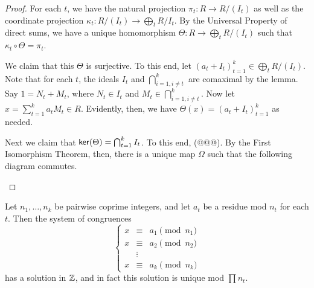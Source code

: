 \begin{proof}
For each \(t\), we have the natural projection \(\pi_t : R \rightarrow R/(I_t)\) as well as the coordinate projection \(\kappa_t : R/(I_t) \rightarrow \bigoplus_t R/I_t\).
By the Universal Property of direct sums, we have a unique homomorphism \(\Theta : R \rightarrow \bigoplus_t R/(I_t)\) such that \(\kappa_t \circ \Theta = \pi_t\).

We claim that this \(\Theta\) is surjective.
To this end, let \((a_t + I_t)_{t=1}^k \in \bigoplus_t R/(I_t)\).
Note that for each \(t\), the ideals \(I_t\) and \(\bigcap_{i=1, i \neq t}^k\) are comaximal by the lemma.
Say \(1 = N_t + M_t\), where \(N_t \in I_t\) and \(M_t \in \bigcap_{i=1,i \neq t}^k\).
Now let \(x = \sum_{t=1}^k a_tM_t \in R\).
Evidently, then, we have \(\Theta(x) = (a_t + I_t)_{t=1}^k\) as needed.

Next we claim that \( \mathsf{ker}(\Theta)  = \bigcap_{t=1}^k I_t\).
To this end, (@@@).
By the First Isomorphism Theorem, then, there is a unique map \(\Omega\) such that the following diagram commutes.
\begin{center}
\end{center}
\end{proof}

\begin{cor}
Let \(n_1, \ldots, n_k\) be pairwise coprime integers, and let \(a_t\) be a residue mod \(n_t\) for each \(t\).
Then the system of congruences \[ \left\{ \begin{array}{rcl} x & \equiv & a_1 \pmod{n_1} \\ x & \equiv & a_2 \pmod{n_2} \\ & \vdots & \\ x & \equiv & a_k \pmod{n_k} \end{array} \right. \] has a solution in \(\mathbb{Z}\), and in fact this solution is unique mod \(\prod n_t\).
\end{cor}
